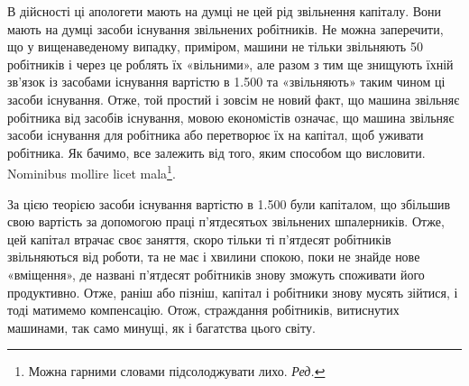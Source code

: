 В дійсності ці апологети мають на думці не цей рід звільнення
капіталу. Вони мають на думці засоби існування звільнених робітників.
Не можна заперечити, що у вищенаведеному випадку,
приміром, машини не тільки звільняють 50 робітників і через це
роблять їх «вільними», але разом з тим ще знищують їхній зв’язок
із засобами існування вартістю в \num{1.500} та
«звільняють» таким чином ці засоби існування. Отже, той простий
і зовсім не новий факт, що машина звільняє робітника від
засобів існування, мовою економістів означає, що машина звільняє
засоби існування для робітника або перетворює їх на капітал,
щоб уживати робітника. Як бачимо, все залежить від того, яким
способом що висловити. Nominibus mollire licet mala\footnote*{
Можна гарними словами підсолоджувати лихо. \emph{Ред.}
}.

За цією теорією засоби існування вартістю в \num{1.500} були капіталом, що збільшив свою вартість за допомогою
праці п’ятдесятьох звільнених шпалерників. Отже, цей
капітал втрачає своє заняття, скоро тільки ті п’ятдесят робітників
звільняються від роботи, та не має і хвилини спокою, поки
не знайде нове «вміщення», де названі п’ятдесят робітників
знову зможуть споживати його продуктивно. Отже, раніш або
пізніш, капітал і робітники знову мусять зійтися, і тоді матимемо
компенсацію. Отож, страждання робітників, витиснутих машинами,
так само минущі, як і багатства цього світу.

